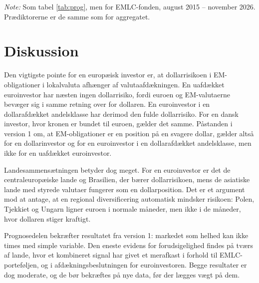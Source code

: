 \documentclass[11pt,a4paper]{article}
\begin{document}
\begin{table}[htbp]
\centering
\begin{threeparttable}
\caption{Forudsigelse af EMLC-fondens overskudsafkast uden for stikprøven}
\label{tab:progemlc}
\footnotesize
\setlength{\tabcolsep}{4pt}

\begin{tablenotes}\footnotesize
\item \emph{Note:} Som tabel \ref{tab:prog}, men for EMLC-fonden, august 2015 -- november 2026. Prædiktorerne er de samme som for aggregatet.
\end{tablenotes}
\end{threeparttable}
\end{table}

\section{Diskussion}

Den vigtigste pointe for en europæisk investor er, at dollarrisikoen i EM-obligationer i lokalvaluta afhænger af valutaafdækningen. En uafdækket euroinvestor har næsten ingen dollarrisiko, fordi euroen og EM-valutaerne bevæger sig i samme retning over for dollaren. En euroinvestor i en dollarafdækket andelsklasse har derimod den fulde dollarrisiko. For en dansk investor, hvor kronen er bundet til euroen, gælder det samme. Påstanden i version 1 om, at EM-obligationer er en position på en svagere dollar, gælder altså for en dollarinvestor og for en euroinvestor i en dollarafdækket andelsklasse, men ikke for en uafdækket euroinvestor.

Landesammensætningen betyder dog meget. For en euroinvestor er det de centraleuropæiske lande og Brasilien, der bærer dollarrisikoen, mens de asiatiske lande med styrede valutaer fungerer som en dollarposition. Det er et argument mod at antage, at en regional diversificering automatisk mindsker risikoen: Polen, Tjekkiet og Ungarn ligner euroen i normale måneder, men ikke i de måneder, hvor dollaren stiger kraftigt.

Prognosedelen bekræfter resultatet fra version 1: markedet som helhed kan ikke times med simple variable. Den eneste evidens for forudsigelighed findes på tværs af lande, hvor et kombineret signal har givet et merafkast i forhold til EMLC-porteføljen, og i afdækningsbeslutningen for euroinvestoren. Begge resultater er dog moderate, og de bør bekræftes på nye data, før der lægges vægt på dem.
\end{document}

